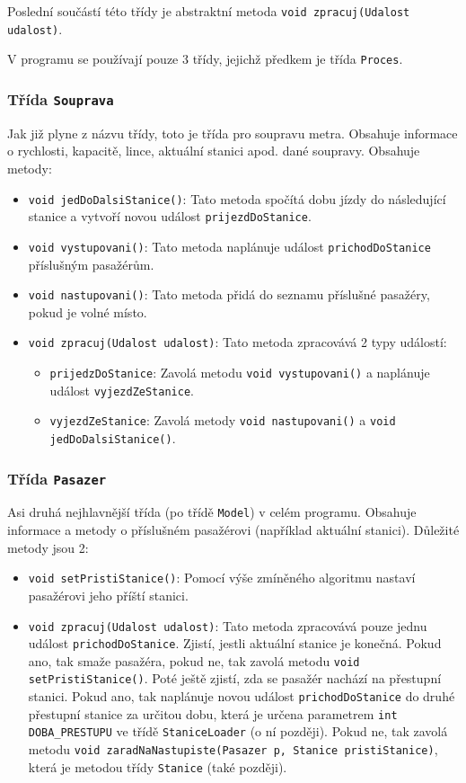 \documentclass[12pt, a4paper]{article}
\begin{document}
Poslední součástí této třídy je abstraktní metoda \texttt{void zpracuj(Udalost udalost)}.

V programu se používají pouze 3 třídy, jejichž předkem je třída \texttt{Proces}.

\subsubsection{Třída \texttt{Souprava}}
Jak již plyne z názvu třídy, toto je třída pro soupravu metra. Obsahuje informace o rychlosti, kapacitě, lince, aktuální stanici apod. dané soupravy. Obsahuje metody:
\begin{itemize}
    \item \texttt{void jedDoDalsiStanice()}: Tato metoda spočítá dobu jízdy do následující stanice a vytvoří novou událost \texttt{prijezdDoStanice}.
    \item \texttt{void vystupovani()}: Tato metoda naplánuje událost \texttt{prichodDoStanice} příslušným pasažérům.
    \item \texttt{void nastupovani()}: Tato metoda přidá do seznamu příslušné pasažéry, pokud je volné místo.
    \item \texttt{void zpracuj(Udalost udalost)}: Tato metoda zpracovává 2 typy událostí:
    \begin{itemize}
        \item \texttt{prijedzDoStanice}: Zavolá metodu \texttt{void vystupovani()} a naplánuje událost \texttt{vyjezdZeStanice}.
        \item \texttt{vyjezdZeStanice}: Zavolá metody \texttt{void nastupovani()} a \texttt{void jedDoDalsiStanice()}.
    \end{itemize}
\end{itemize}

\subsubsection{Třída \texttt{Pasazer}}
Asi druhá nejhlavnější třída (po třídě \texttt{Model}) v celém programu. Obsahuje informace a metody o příslušném pasažérovi (například aktuální stanici). Důležité metody jsou 2:
\begin{itemize}
    \item \texttt{void setPristiStanice()}: Pomocí výše zmíněného algoritmu nastaví pasažérovi jeho příští stanici.
    \item \texttt{void zpracuj(Udalost udalost)}: Tato metoda zpracovává pouze jednu událost \texttt{prichodDoStanice}. Zjistí, jestli aktuální stanice je konečná. Pokud ano, tak smaže pasažéra, pokud ne, tak zavolá metodu \texttt{void setPristiStanice()}. Poté ještě zjistí, zda se pasažér nachází na přestupní stanici. Pokud ano, tak naplánuje novou událost \texttt{prichodDoStanice} do druhé přestupní stanice za určitou dobu, která je určena parametrem \texttt{int DOBA\_PRESTUPU} ve třídě \texttt{StaniceLoader} (o ní později). Pokud ne, tak zavolá metodu \texttt{void zaradNaNastupiste(Pasazer p, Stanice pristiStanice)}, která je metodou třídy \texttt{Stanice} (také později).
\end{itemize}
\end{document}
